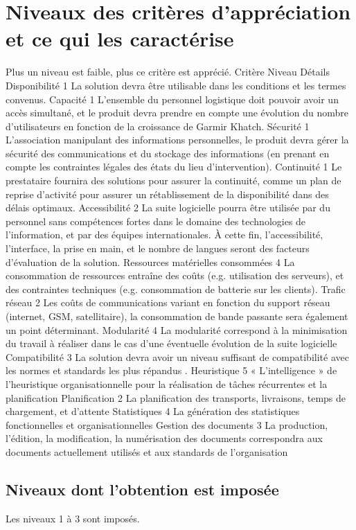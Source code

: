 \documentclass[11pt,fleqn]{book} %
\begin{document}
\section{Niveaux des critères d'appréciation et ce qui les caractérise}
Plus un niveau est faible, plus ce critère est apprécié.
Critère
Niveau
Détails
Disponibilité
1
La solution devra être utilisable dans les conditions et les termes convenus.
Capacité
1
L'ensemble du personnel logistique doit pouvoir avoir un accès simultané, et le produit devra prendre en compte une évolution du nombre d'utilisateurs en fonction de la croissance de Garmir Khatch.
Sécurité
1
L'association manipulant des informations personnelles, le produit devra gérer la sécurité des communications et du stockage des informations (en prenant en compte les contraintes légales des états du lieu d'intervention).
Continuité
1
Le prestataire fournira des solutions pour assurer la continuité, comme un plan de reprise d'activité pour assurer un rétablissement de la disponibilité dans des délais optimaux.
Accessibilité
2
La suite logicielle pourra être utilisée par du personnel sans compétences fortes dans le domaine des technologies de l'information, et par des équipes internationales. À cette fin, l'accessibilité, l'interface, la prise en main, et le nombre de langues seront des facteurs d'évaluation de la solution.
Ressources matérielles consommées
4
La consommation de ressources entraîne des coûts (e.g. utilisation des serveurs), et des contraintes techniques (e.g. consommation de batterie sur les clients).
Trafic réseau
2
Les coûts de communications variant en fonction du support réseau (internet, GSM, satellitaire), la consommation de bande passante sera également un point déterminant.
Modularité
4
La modularité correspond à la minimisation du travail à réaliser dans le cas d'une éventuelle évolution de la suite logicielle
Compatibilité
3
La solution devra avoir un niveau suffisant de compatibilité avec les normes et standards les plus répandus .
Heuristique
5
« L'intelligence » de l'heuristique organisationnelle pour la réalisation de tâches récurrentes et la planification
Planification
2
La planification des transports, livraisons, temps de chargement, et d'attente
Statistiques
4
La génération des statistiques fonctionnelles et organisationnelles
Gestion des documents
3
La production, l'édition, la modification, la numérisation des documents correspondra aux documents actuellement utilisés et aux standards de l'organisation

\subsection{Niveaux dont l'obtention est imposée}
Les niveaux 1 à 3 sont imposés.
\end{document}
